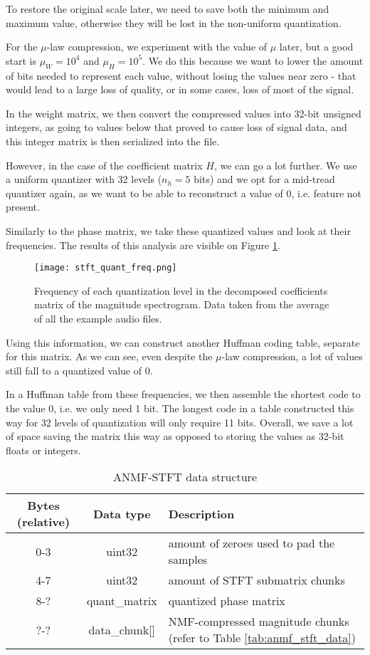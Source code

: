 To restore the original scale later, we need to save both the minimum and maximum value, otherwise they will be lost in the non-uniform quantization.

For the $\mu$-law compression, we experiment with the value of $\mu$ later, but a good start is $\mu_W = 10^4$ and $\mu_H = 10^5$. We do this because we want to lower the amount of bits needed to represent each value, without losing the values near zero - that would lead to a large loss of quality, or in some cases, loss of most of the signal.

In the weight matrix, we then convert the compressed values into 32-bit unsigned integers, as going to values below that proved to cause loss of signal data, and this integer matrix is then serialized into the file.

However, in the case of the coefficient matrix $H$, we can go a lot further. We use a uniform quantizer with 32 levels ($n_h = 5$ bits) and we opt for a mid-tread quantizer again, as we want to be able to reconstruct a value of $0$, i.e. feature not present.

Similarly to the phase matrix, we take these quantized values and look at their frequencies. The results of this analysis are visible on Figure \ref{fig:stft_quant_freq}.

\begin{figure}[ht]
	\caption[ANMF-STFT quantized magnitude coefficient frequencies]{Frequency of each quantization level in the decomposed coefficients matrix of the magnitude spectrogram. Data taken from the average of all the example audio files.}
	\label{fig:stft_quant_freq}
	\centering
	\texttt{[image: stft\_quant\_freq.png]}
\end{figure}

Using this information, we can construct another Huffman coding table, separate for this matrix. As we can see, even despite the $\mu$-law compression, a lot of values still fall to a quantized value of $0$.

In a Huffman table from these frequencies, we then assemble the shortest code to the value $0$, i.e. we only need 1 bit. The longest code in a table constructed this way for 32 levels of quantization will only require 11 bits. Overall, we save a lot of space saving the matrix this way as opposed to storing the values as 32-bit floats or integers.

\begin{table}[htbp]\caption{ANMF-STFT data structure}
	\label{tab:anmf_stft_file}
	\centering
	\begin{tabular}{|c|c|l|}
		\hline
		Bytes (relative) & Data type & Description \\ \hline
		0-3 & uint32 & amount of zeroes used to pad the samples \\
		4-7 & uint32 & amount of STFT submatrix chunks \\
		8-? & quant\_matrix & quantized phase matrix \\
		?-? & data\_chunk[] & NMF-compressed magnitude chunks (refer to Table \ref{tab:anmf_stft_data}) \\
		\hline
	\end{tabular}
\end{table}


